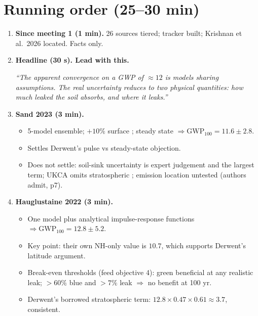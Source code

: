 \documentclass[10pt,a4paper]{article}
\begin{document}
\section{Running order (25--30 min)}
\begin{enumerate}[label=\textbf{\arabic*.}]
  \item \textbf{Since meeting 1 (1 min).} 26 sources tiered; tracker built; Krishnan et al.\ 2026 located. Facts only.

  \item \textbf{Headline (30 s). Lead with this.}
  \begin{tcolorbox}[colback=gray!8,colframe=gray!50,boxsep=2pt,left=4pt,right=4pt,top=2pt,bottom=2pt]
  \emph{``The apparent convergence on a GWP of $\approx 12$ is models sharing assumptions. The real uncertainty reduces to two physical quantities: how much leaked  the soil absorbs, and where it leaks.''}
  \end{tcolorbox}

  \item \textbf{Sand 2023 (3 min).}
  \begin{itemize}
    \item 5-model ensemble; $+10\%$ surface ; steady state $\Rightarrow \mathrm{GWP}_{100} = 11.6 \pm 2.8$.
    \item Settles Derwent's pulse vs steady-state objection.
    \item Does not settle: soil-sink uncertainty is expert judgement and the largest term; UKCA omits stratospheric ; emission location untested (authors admit, p7).
  \end{itemize}

  \item \textbf{Hauglustaine 2022 (3 min).}
  \begin{itemize}
    \item One model plus analytical impulse-response functions $\Rightarrow \mathrm{GWP}_{100} = 12.8 \pm 5.2$.
    \item Key point: their own NH-only value is $10.7$, which supports Derwent's latitude argument.
    \item Break-even thresholds (feed objective 4): green  beneficial at any realistic leak; $>60\%$ blue and $>7\%$ leak $\Rightarrow$ no benefit at 100 yr.
    \item Derwent's borrowed stratospheric term: $12.8 \times 0.47 \times 0.61 \approx 3.7$, consistent.
  \end{itemize}


\end{enumerate}
\end{document}

